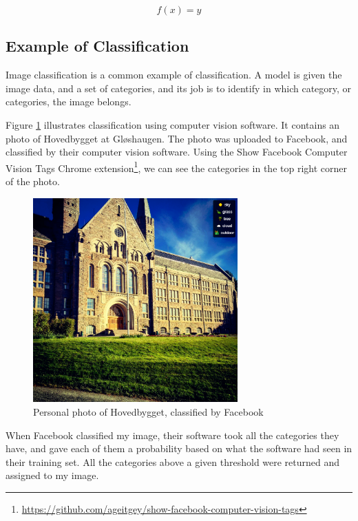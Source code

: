 \begin{equation}
    \label{eq:simple_function}
    f(x) = y
\end{equation}

\subsection{Example of Classification}
\label{sec:classification-example}
Image classification is a common example of classification. A model is given the image data, and a set of categories, and its job is to identify in which category, or categories, the image belongs.

Figure \ref{fig:facebook-classification-example} illustrates classification using computer vision software. It contains an photo of Hovedbygget at Gløshaugen. The photo was uploaded to Facebook, and classified by their computer vision software. Using the Show Facebook Computer Vision Tags Chrome extension\footnote{\url{https://github.com/ageitgey/show-facebook-computer-vision-tags}}, we can see the categories in the top right corner of the photo.

\begin{figure}[H]
    \label{fig:facebook-classification-example}
    \centering
    \includegraphics[width=0.7\textwidth]{fig/chapter4/facebook_classification_example.png}
    \caption{Personal photo of Hovedbygget, classified by Facebook}
\end{figure}

When Facebook classified my image, their software took all the categories they have, and gave each of them a probability based on what the software had seen in their training set. All the categories above a given threshold were returned and assigned to my image. 

